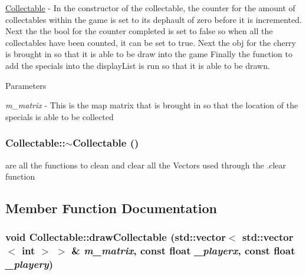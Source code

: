 \hyperlink{classCollectable}{Collectable} -\/ In the constructor of the collectable, the counter for the amount of collectables within the game is set to its dephault of zero before it is incremented. Next the the bool for the counter completed is set to false so when all the collectables have been counted, it can be set to true. Next the obj for the cherry is brought in so that it is able to be draw into the game Finally the function to add the specials into the displayList is run so that it is able to be drawn. 
\begin{DoxyParams}{Parameters}
\item[{\em m\_\-matrix}]-\/ This is the map matrix that is brought in so that the location of the specials is able to be collected \end{DoxyParams}
\hypertarget{classCollectable_a420214e6656c670e88885b6f9716547b}{
\subsubsection[{$\sim$Collectable}]{\setlength{\rightskip}{0pt plus 5cm}Collectable::$\sim$Collectable ()}}
\label{classCollectable_a420214e6656c670e88885b6f9716547b}


are all the functions to clean and clear all the Vectors used through the .clear function 

\subsection{Member Function Documentation}
\hypertarget{classCollectable_ad807d275eeb43d6bdc7af1ac80f59175}{
\subsubsection[{drawCollectable}]{\setlength{\rightskip}{0pt plus 5cm}void Collectable::drawCollectable (std::vector$<$ std::vector$<$ int $>$ $>$ \& {\em m\_\-matrix}, \/  const float {\em \_\-playerx}, \/  const float {\em \_\-playery})}}
\label{classCollectable_ad807d275eeb43d6bdc7af1ac80f59175}


